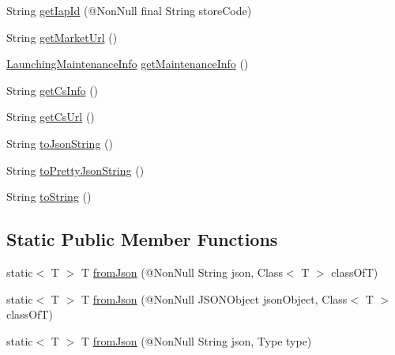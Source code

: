 \begin{DoxyCompactItemize}
\item 
String \hyperlink{classcom_1_1toast_1_1android_1_1gamebase_1_1launching_1_1data_1_1_launching_info_a92287e4e65b01d9f2e38e19fd1861f4f}{get\+Iap\+Id} (@Non\+Null final String store\+Code)
\item 
String \hyperlink{classcom_1_1toast_1_1android_1_1gamebase_1_1launching_1_1data_1_1_launching_info_a07ddced6fd80f99c6a8024b6d2da04f7}{get\+Market\+Url} ()
\item 
\hyperlink{classcom_1_1toast_1_1android_1_1gamebase_1_1launching_1_1data_1_1_launching_maintenance_info}{Launching\+Maintenance\+Info} \hyperlink{classcom_1_1toast_1_1android_1_1gamebase_1_1launching_1_1data_1_1_launching_info_a7544771471aa23597d26ae5253cbaf6c}{get\+Maintenance\+Info} ()
\item 
String \hyperlink{classcom_1_1toast_1_1android_1_1gamebase_1_1launching_1_1data_1_1_launching_info_a1786ce2957f82653e6c77e6d6156f8f8}{get\+Cs\+Info} ()
\item 
String \hyperlink{classcom_1_1toast_1_1android_1_1gamebase_1_1launching_1_1data_1_1_launching_info_ab55e2b5ac6e5f8b56cd164b27be6eaac}{get\+Cs\+Url} ()
\item 
String \hyperlink{classcom_1_1toast_1_1android_1_1gamebase_1_1base_1_1_value_object_a58acf6402880e9769d79d8667581fa6a}{to\+Json\+String} ()
\item 
String \hyperlink{classcom_1_1toast_1_1android_1_1gamebase_1_1base_1_1_value_object_a054431f3d988a22295cfc8b784ff2637}{to\+Pretty\+Json\+String} ()
\item 
String \hyperlink{classcom_1_1toast_1_1android_1_1gamebase_1_1base_1_1_value_object_ad146fa8579a5f8a876c4688cc5a68520}{to\+String} ()
\end{DoxyCompactItemize}
\subsection*{Static Public Member Functions}
\begin{DoxyCompactItemize}
\item 
static$<$ T $>$ T \hyperlink{classcom_1_1toast_1_1android_1_1gamebase_1_1base_1_1_value_object_ae6655c88c20a9a8406dc11b46250ac7b}{from\+Json} (@Non\+Null String json, Class$<$ T $>$ class\+OfT)
\item 
static$<$ T $>$ T \hyperlink{classcom_1_1toast_1_1android_1_1gamebase_1_1base_1_1_value_object_ab83c4196ee2e3f11553bbe0f04dc2101}{from\+Json} (@Non\+Null J\+S\+O\+N\+Object json\+Object, Class$<$ T $>$ class\+OfT)
\item 
static$<$ T $>$ T \hyperlink{classcom_1_1toast_1_1android_1_1gamebase_1_1base_1_1_value_object_aa901d97d495150b54bcb80c05672f58a}{from\+Json} (@Non\+Null String json, Type type)
\end{DoxyCompactItemize}
